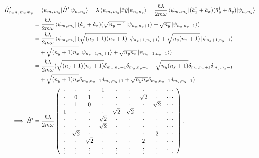 \documentclass[10pt]{article}
\newcommand{\1}{\mathbf 1}
\begin{document}
\begin{align}
	\hat H'_{n_xn_ym_xm_y}
	&=\nonumber
	\braket{\psi_{m_xm_y} | \hat H'| \psi_{n_xn_y} }
	=
	\lambda
	\braket{\psi_{m_xm_y} | \hat x \hat y| \psi_{n_xn_y} }
	=
	\frac{\hbar\lambda}{2 m \omega}
	\braket{\psi_{m_xm_y} | (\hat a_x^\dagger + \hat a_x) (\hat a_y^\dagger + \hat a_y)| \psi_{n_xn_y} }
	\\
	&=\nonumber
	\frac{\hbar\lambda}{2 m \omega}
	\bra{\psi_{m_xm_y}}  (\hat a_x^\dagger + \hat a_x) (\sqrt{n_y + 1}\ket{\psi_{n_x,n_y+1} } + \sqrt{n_y} \ket{\psi_{n_x,n_y-1} })
	\\
	&=\nonumber
	\frac{\hbar\lambda}{2 m \omega}
	\bra{\psi_{m_xm_y}}  (\sqrt{(n_y + 1)(n_x + 1)}\ket{\psi_{n_x+1,n_y+1} } + \sqrt{n_y(n_x+1)} \ket{\psi_{n_x+1,n_y-1} } 
	\\ & \nonumber\quad + \sqrt{(n_y + 1)n_x}\ket{\psi_{n_x-1,n_y+1} } + \sqrt{n_yn_x} \ket{\psi_{n_x-1,n_y-1} })
	\\
	&=\nonumber
	\frac{\hbar\lambda}{2 m \omega}
	(\sqrt{(n_y + 1)(n_x + 1)}\delta_{m_x,n_x+1}\delta_{m_y,n_y+1} + \sqrt{n_y(n_x+1)} \delta_{m_x,n_x+1}\delta_{m_y,n_y-1}
	\\
	&\quad%
	 + \sqrt{(n_y + 1)n_x}\delta_{m_x,n_x-1}\delta_{m_y,n_y+1} + \sqrt{n_yn_x}\delta_{m_x,n_x-1}\delta_{m_y,n_y-1})
	 \\
	 \implies \hat H'
	&=
	\frac{\hbar\lambda}{2 m \omega}
	\left(
		\begin{array}{ccccccccc}
		 \cdot & \cdot & \cdot & 1 & \cdot & \cdot & \cdot & \cdot & \cdots \\
		 \cdot & 0 & 1 & \cdot & \cdot & \cdot & \sqrt{2} & \cdot & \cdots \\
		 \cdot & 1 & 0 & \cdot & \cdot & \cdot & \cdot & \sqrt{2} & \cdots \\
		 1 & \cdot & \cdot & \cdot & \sqrt{2} & \sqrt{2} & \cdot & \cdot & \cdots \\
		 \cdot & \cdot & \cdot & \sqrt{2} & \cdot & \cdot & \cdot & \cdot & \cdots \\
		 \cdot & \cdot & \cdot & \sqrt{2} & \cdot & \cdot & \cdot & \cdot & \cdots \\
		 \cdot & \sqrt{2} & \cdot & \cdot & \cdot & \cdot & \cdot & 2 & \cdots \\
		 \cdot & \cdot & \sqrt{2} & \cdot & \cdot & \cdot & 2 & \cdot & \cdots \\
		 \vdots & \vdots & \vdots & \vdots & \vdots & \vdots & \vdots & \vdots & \ddots
		\end{array}
		\right).
\end{align}
\end{document}
